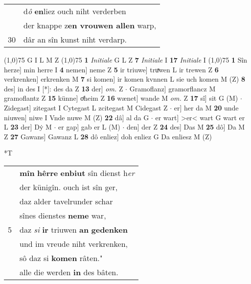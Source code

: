 \documentclass[8pt,a4paper,notitlepage]{article}
\begin{document}
\begin{table}[ht]
\begin{minipage}[t]{0.5\linewidth}
\begin{tabular}{rl}
 & d\textit{ô} \textbf{en}liez ouch niht verderben\\ 
 & der knappe z\textbf{en vrouwen allen} warp,\\ 
30 & dâr an sîn kunst niht verdarp.\\ 
\end{tabular}
\scriptsize
\line(1,0){75} \newline
G I L M Z \newline
\line(1,0){75} \newline
\textbf{1} \textit{Initiale} G L Z  \textbf{7} \textit{Initiale} I  \textbf{17} \textit{Initiale} I  \newline
\line(1,0){75} \newline
\textbf{1} Sîn herze] min herre I \textbf{4} nemen] neme Z \textbf{5} ir triuwe] truͯwen L ir trewen Z \textbf{6} verkrenken] erkrenken M \textbf{7} si komen] ir komen kvnnen L sie uch komen M (Z) \textbf{8} des] in des I [*]: des da Z \textbf{13} der] \textit{om.} Z  $\cdot$ Gramoflanz] gramorflancz M gramoflantz Z \textbf{15} künne] oͤheim Z \textbf{16} wænet] wande M \textit{om.} Z \textbf{17} sî] sit G (M)  $\cdot$ Zidegast] zitegast I Cytegast L zcitegast M Cidegast Z  $\cdot$ er] her da M \textbf{20} unde niuwen] niwe I Vnde nuwe M (Z) \textbf{22} dâ] al da G  $\cdot$ er wart] >er< wart G wart er L \textbf{23} der] Dẏ M  $\cdot$ er gap] gab er L (M)  $\cdot$ den] der Z \textbf{24} des] Das M \textbf{25} dô] Da M Z \textbf{27} Gawans] Gawanz L \textbf{28} dô enliez] doh enliez G Da enliesz M (Z) \newline
\end{minipage}
\hspace{0.5cm}
\begin{minipage}[t]{0.5\linewidth}
\small
\begin{center}*T
\end{center}
\begin{tabular}{rl}
 & \textbf{mîn} \textbf{hêrre} \textbf{enbiut} sîn dienst h\textit{er}\\ 
 & der künigîn. ouch ist sîn ger,\\ 
 & daz alder tavelrunder schar\\ 
 & sînes dienstes \textbf{neme} war,\\ 
5 & daz \textit{si} \textbf{ir} triuwen \textbf{an} \textbf{gedenken}\\ 
 & und im vreude niht verkrenken,\\ 
 & sô daz si \textbf{komen} râten."\\ 
 & alle die werden \textbf{in} des bâten.\\ 

\end{tabular}
\end{minipage}
\end{table}
\end{document}
